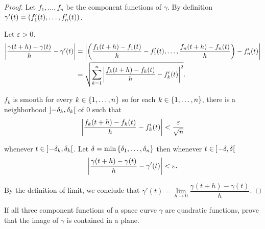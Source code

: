 \begin{proof}
	Let $f_{1}, \ldots, f_{n}$ be the component functions of $\gamma$. By definition $\gamma'(t) = \left({f_{1}'(t), \ldots, f_{n}'(t)}\right)$.

	Let $\varepsilon > 0$.
	\begin{align*}
		\left\vert{\frac{\gamma(t + h) - \gamma(t)}{h} - \gamma'(t)}\right\vert & = \left\vert{\left({\frac{f_{1}(t + h) - f_{1}(t)}{h} - f_{1}'(t), \ldots, \frac{f_{n}(t + h) - f_{n}(t)}{h}}\right) - f_{n}'(t)}\right\vert \\
		                                                       & = \sqrt{\sum^{n}_{k=1} \left\vert{\frac{f_{k}(t + h) - f_{k}(t)}{h} - f_{k}'(t)}\right\vert^{2}}.
	\end{align*}

	$f_{k}$ is smooth for every $k \in \left\{{1, \ldots, n}\right\}$ so for each $k \in \left\{{1, \ldots, n}\right\}$, there is a neighborhood $\left]{-\delta_{k}, \delta_{k}}\right[$ of 0 such that
	\begin{align*}
		\left\vert{\frac{f_{k}(t + h) - f_{k}(t)}{h} - f_{k}'(t)}\right\vert < \frac{\varepsilon}{\sqrt{n}}
	\end{align*}

	whenever $t \in \left]{-\delta_{k}, \delta_{k}}\right[$. Let $\delta = \min\left\{{\delta_{1}, \ldots, \delta_{n}}\right\}$ then whenever $t \in \left]{-\delta, \delta}\right[$
	\begin{align*}
		\left\vert{\frac{\gamma(t + h) - \gamma(t)}{h} - \gamma'(t)}\right\vert < \varepsilon.
	\end{align*}

	By the definition of limit, we conclude that $\gamma'(t) = \lim\limits_{h\to 0} \dfrac{\gamma(t + h) - \gamma(t)}{h}$.
\end{proof}

\begin{exercise}{1.6}\label{exercise:1.6}
	If all three component functions of a space curve $\gamma$ are quadratic functions, prove that the image of $\gamma$ is contained in a plane.
\end{exercise}

